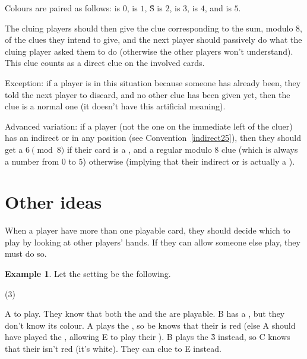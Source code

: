 \documentclass[a4paper]{article}
\theoremstyle{plain}
\theoremstyle{definition}
\newtheorem{example}[theorem]{Example}
\begin{document}
Colours are paired as follows:  is $0$,  is $1$, \G{S} is $2$,  is $3$,  is $4$, and  is $5$.

The cluing players should then give the clue corresponding to the sum, modulo 8, of the clues they intend to give, and the next player should passively do what the cluing player asked them to do (otherwise the other players won't understand). This clue counts as a direct clue on the involved cards.

Exception: if a player is in this situation because someone has already been, they told the next player to discard, and no other clue has been given yet, then the clue is a normal one (it doesn't have this artificial meaning).

Advanced variation: if a player (not the one on the immediate left of the cluer) has an indirect  or  in any position (see Convention~\ref{indirect25}), then they should get a $6 \pmod 8$ if their card is a , and a regular modulo $8$ clue (which is always a number from $0$ to $5$) otherwise (implying that their indirect  or  is actually a ).

\section{Other ideas}

When a player have more than one playable card, they should decide which to play by looking at other players' hands. If they can allow someone else play, they must do so.

\begin{example}
	
	Let the setting be the following.
	
	\begin{tasks}(3)
		\task[+]      
		\task[A]    
		\task[B]    
		\task[C]    
		\task[D]    
		\task[E]    
	\end{tasks}
	
	A to play. They know that both the  and the  are playable. B has a , but they don't know its colour. A plays the , so be knows that their  is red (else A should have played the , allowing E to play their ). B plays the \G{3} instead, so C knows that their  isn't red (it's white). They can clue  to E instead.
\end{example}
\end{document}
